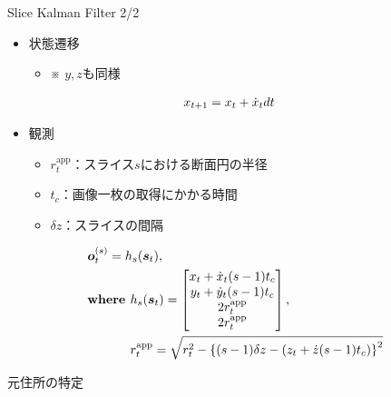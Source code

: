 \begin{frame}[noframenumbering]{Slice Kalman Filter 2/2}
    \begin{itemize}
        \item 状態遷移
        \begin{itemize}
            \item ※ $y,z$も同様
        \end{itemize}
    \end{itemize}
    \begin{equation}
        \notag
        \begin{aligned}
            & x_{t+1} = x_t + \dot{x}_t dt
        \end{aligned}
    \end{equation}
    \begin{itemize}
        \item 観測
        \begin{itemize}
            \item $r_t^{\text{app}}$：スライス$s$における断面円の半径
            \item $t_c$：画像一枚の取得にかかる時間
            \item $\delta z$：スライスの間隔
        \end{itemize}
    \end{itemize}
    \begin{equation}
        \notag
        \begin{aligned}
            & \bm{o}_t^{(s)} = h_s(\bm{s}_t),
            \\ & \textbf{where } h_s(\bm{s}_t) = \begin{bmatrix}
                x_t + \dot{x}_t (s-1) t_c
                \\ y_t + \dot{y}_t (s-1) t_c
                \\ 2 r_t^{\text{app}}
                \\ 2 r_t^{\text{app}}
            \end{bmatrix},
            \\ & \phantom{\textbf{where }} r_t^{\text{app}} = \sqrt{r_t^2 - \left\{(s-1) \delta z - (z_t + \dot{z} (s-1) t_c)\right\}^2}
        \end{aligned}
    \end{equation}
\end{frame}

\begin{frame}[noframenumbering]{元住所の特定}
\end{frame}